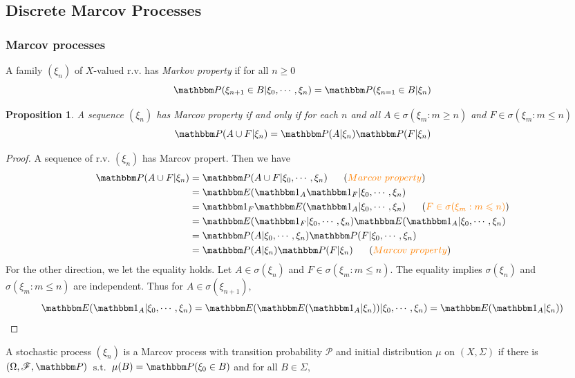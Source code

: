 \documentclass[12pt, reqno]{amsart}
\renewcommand{\leq}{\leqslant}
\renewcommand{\geq}{\geqslant}
\newcommand{\st}{\ensuremath{\ \mathrm{s.t.}\ }}
\newcommand{\1}{\mathbbm 1}
\newcommand{\fF}{\mathscr F}
\newcommand{\pP}{\mathcal P}
\newcommand{\PP}{\mathbbm P}
\newcommand{\EE}{\mathbbm E}
\theoremstyle{plain}
\newtheorem{proposition}[theorem]{Proposition}
\theoremstyle{definition}
\begin{document}
\subsection{Discrete Marcov Processes}
\subsubsection{Marcov processes}
A family $(\xi_n)$ of $X$-valued r.v. has \emph{Markov property} if for all $n\geq0$
\begin{equation*}
    \PP(\xi_{n+1}\in B|\xi_0,\cdots,\xi_n)=\PP(\xi_{n=1}\in B|\xi_n)
\end{equation*}
\begin{proposition}
	A sequence $(\xi_n)$ has Marcov property if and only if for each $n$ and all $A\in \sigma(\xi_m: m\geq n)$ and  $F\in \sigma(\xi_m: m\leq n)$
	$$\PP(A\cup F|\xi_n)=\PP(A|\xi_n)\PP(F|\xi_n)$$
\end{proposition}
\begin{proof}
	A sequence of r.v. $(\xi_n)$ has Marcov propert. Then we have
	\begin{align*} 
	\PP(A\cup F|\xi_n)&=\PP(A\cup F|\xi_0,\cdots,\xi_n)~~~~~(\textcolor{orange}{Marcov~ property})\\
	                             &=\EE(\1_A\1_F|\xi_0,\cdots,\xi_n) \\
	                             &=\1_F\EE(\1_A|\xi_0,\cdots,\xi_n) ~~~~~(\textcolor{orange}{F\in  \sigma(\xi_m: m\leq n) })\\
	                             &=\EE(\1_F|\xi_0,\cdots,\xi_n)\EE(\1_A|\xi_0,\cdots,\xi_n)\\
	                             &=\PP(A|\xi_0,\cdots,\xi_n)\PP( F|\xi_0,\cdots,\xi_n)\\
	                             &=\PP(A|\xi_n)\PP( F|\xi_n)~~~~~(\textcolor{orange}{Marcov~ property})
	\end{align*}
	For the other direction, we let the equality holds. Let $A\in\sigma(\xi_n)$ and $F\in \sigma(\xi_m: m\leq n)$. The equality implies $\sigma(\xi_n)$ and $\sigma(\xi_m: m\leq n)$ are independent. Thus for $A\in \sigma(\xi_{n+1}),$
	\begin{equation*}
	\EE(\1_A|\xi_0,\cdots,\xi_n)=\EE(\EE(\1_A|\xi_n))|\xi_0,\cdots,\xi_n)=\EE(\1_A|\xi_n))
	\end{equation*}
\end{proof}
A stochastic process $(\xi_n)$ is a Marcov process with transition probability $\pP$ and initial distribution $\mu$ on $(X,\Sigma)$ if there is $(\Omega,\fF,\PP)$ $\st$ $\mu(B)=\PP(\xi_0\in B)$ and for all $B\in \Sigma,$
\end{document}
